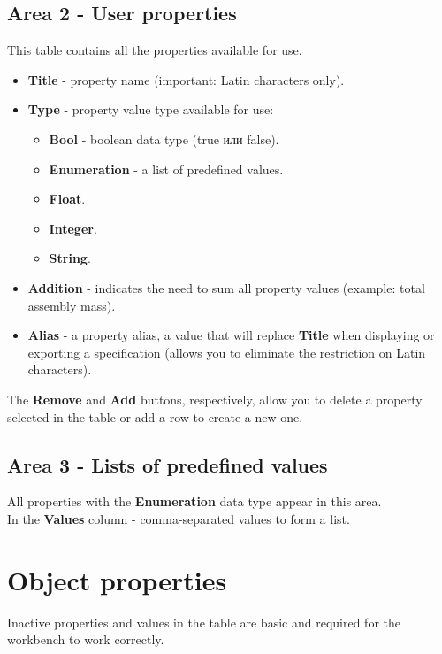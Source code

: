 \documentclass[a4paper,12pt]{article}
\begin{document}
\pagebreak

\subsection{Area 2 - User properties}
This table contains all the properties available for use.
\begin{itemize}
	\item \textbf{Title} - property name (important: Latin characters only).
	\item \textbf{Type} - property value type available for use:
	\begin{itemize}
		\item \textbf{Bool} - boolean data type (true или false).
		\item \textbf{Enumeration} - a list of predefined values.
		\item \textbf{Float}.
		\item \textbf{Integer}.
		\item \textbf{String}.
	\end{itemize}
	\item \textbf{Addition} - indicates the need to sum all property values ​​(example: total assembly mass).
	\item \textbf{Alias} - a property alias, a value that will replace \textbf{Title} when displaying or exporting a specification (allows you to eliminate the restriction on Latin characters).
\end{itemize}

\begin{flushleft}The \textbf{Remove} and \textbf{Add} buttons, respectively, allow you to delete a property selected in the table or add a row to create a new one.\end{flushleft}


\subsection{Area 3 - Lists of predefined values}
All properties with the \textbf{Enumeration} data type appear in this area.\\In the \textbf{Values} ​​column - comma-separated values ​​to form a list.




\section{Object properties}
Inactive properties and values ​​in the table are basic and required for the workbench to work correctly.
\end{document}
